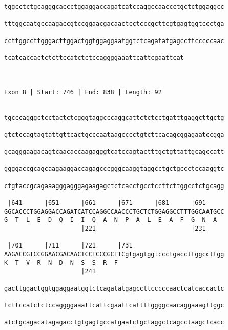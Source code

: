 \documentclass{article}
\begin{document}
\begin{Verbatim}
tggcctctgcagggcaccctggaggaccagatcatccaggccaaccctgctctggaggcc
                                                            
tttggcaatgccaagaccgtccggaacgacaactcctcccgcttcgtgagtggtccctga
                                                            
ccttggccttgggacttggactggtggaggaatggtctcagatatgagccttcccccaac
                                                            
tcatcaccactctcttccatctctccaggggaaattcattcgaattcat
                                                 
                                                 
 
Exon 8 | Start: 746 | End: 838 | Length: 92


tgcccagggctcctactctcgggtaggcccaggcattctctcctgatttgaggcttgctg
                                                            
gtctccagtagtattgttcactgcccaataagcccctgtcttcacagcggagaatccgga
                                                            
gcagggaagacagtcaacaccaagagggtcatccagtactttgctgttattgcagccatt
                                                            
ggggaccgcagcaagaaggaccagagcccgggcaaggtaggcctgctgccctccaaggtc
                                                            
ctgtaccgcagaaagggagggagaagagctctcacctgcctccttcttggcctctgcagg
                                                            
 |641      |651      |661      |671      |681      |691     
GGCACCCTGGAGGACCAGATCATCCAGGCCAACCCTGCTCTGGAGGCCTTTGGCAATGCC
G  T  L  E  D  Q  I  I  Q  A  N  P  A  L  E  A  F  G  N  A  
                     |221                          |231     
  
 |701      |711      |721      |731                         
AAGACCGTCCGGAACGACAACTCCTCCCGCTTCgtgagtggtccctgaccttggccttgg
K  T  V  R  N  D  N  S  S  R  F                             
                     |241                                   
  
gacttggactggtggaggaatggtctcagatatgagccttcccccaactcatcaccactc
                                                            
tcttccatctctccaggggaaattcattcgaattcattttggggcaacaggaaagttggc
                                                            
atctgcagacatagagacctgtgagtgccatgaatctgctaggctcagcctaagctcacc
                                                            

\end{Verbatim}
\end{document}
